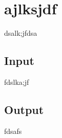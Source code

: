 \documentclass{article}
\begin{document}
\section*{ajlksjdf}

dsalk;jfdsa



\subsection*{Input}
fdslka;jf



\subsection*{Output}
fdsafs
\end{document}

